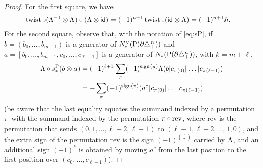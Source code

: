 \begin{proof}
	For the first square, we have
	\begin{align*}
		\operatorname{twist}\circ(\Lambda^{-1} \otimes  \Lambda)\circ (\Lambda \otimes  \mathsf{id})
		&= (-1)^{n+1} \operatorname{twist}\circ(\mathsf{id} \otimes  \Lambda)
		= (-1)^{n+1} h.
	\end{align*}
	For the second square, observe that, with the notation of \eqref{eq:sP}, if $b = (b_0,\ldots,b_{m-1})$ is a generator of $N^\vee_{*}(\operatorname{P}(\partial\triangle_{+}^n))$ and $a = [b_0,\ldots,b_{m-1},c_0,\ldots,c_{\ell-1}]$ is a generator of $N_{*}(\operatorname{P}(\partial\triangle_{+}^n))$, with $k=m+\ell$,
	\begin{equation}\label{eq:lastsign}
		\begin{split}
			\Lambda\circ s_*^{\operatorname{P}} (b \otimes  a)
			&= (-1)^{\ell+1}\sum_{\pi} (-1)^{\operatorname{sign}(\pi)} \Lambda(b|c_{\pi(0)}|\ldots|c_{\pi(\ell-1)})
			\\
			&= -\sum_{\pi} (-1)^{\operatorname{sign}(\pi)} (a^c|c_{\pi(0)}|\ldots|c_{\pi(\ell-1)})
		\end{split}
	\end{equation}
	(be aware that the last equality equates the summand indexed by a permutation $\pi$ with the summand indexed by the permutation $\pi\circ \mathrm{rev}$, where $\mathrm{rev}$ is the permutation that sends $(0,1,\ldots,\ell-2,\ell-1)$ to $(\ell-1,\ell-2,\ldots,1,0)$, and the extra sign of the permutation $\mathrm{rev}$ is the sign $(-1)^{\binom{\ell}{2}}$ carried by $\Lambda$, and an additional sign $(-1)^{\ell}$ is obtained by moving $a^c$ from the last position to the first position over $(c_0,\ldots,c_{\ell-1})$).


\end{proof}
